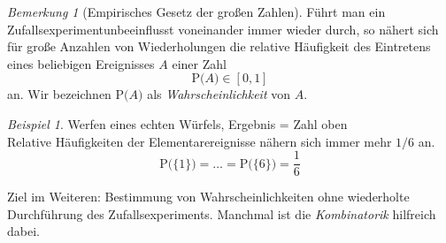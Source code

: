 \documentclass[a4paper,12pt,fleqn]{scrartcl}
\newcommand{\prob}[1]{\text{P(} #1 \text{)}}
\newcommand{\ZE}{Zufallsexperiment}
\newcommand{\unit}{\left[ 0,1\right]}
\theoremstyle{definition}
\theoremstyle{plain}
\theoremstyle{remark}
\newtheorem*{bemerkung}{Bemerkung}
\newtheorem{beispiel}[definition]{Beispiel}
\begin{document}
\begin{bemerkung}[Empirisches Gesetz der großen Zahlen]
Führt man ein \ZE unbeeinflusst voneinander immer wieder durch, so nähert sich für große Anzahlen von Wiederholungen die relative Häufigkeit des Eintretens eines beliebigen Ereignisses $A$ einer Zahl
\[\prob{A} \in\unit\]
an. Wir bezeichnen $\prob{A}$ als \emph{Wahrscheinlichkeit} von $A$.
\end{bemerkung}
\begin{beispiel}
Werfen eines echten Würfels, Ergebnis = Zahl oben\\
Relative Häufigkeiten der Elementarereignisse nähern sich immer mehr $1/6$ an.
\[\prob{\{ 1\}}=\ldots=\prob{\{ 6\} }=\frac{1}{6}\]
\end{beispiel}
Ziel im Weiteren: Bestimmung von Wahrscheinlichkeiten ohne wiederholte Durchführung des \ZE s. Manchmal ist die \emph{Kombinatorik} hilfreich dabei.
\end{document}
